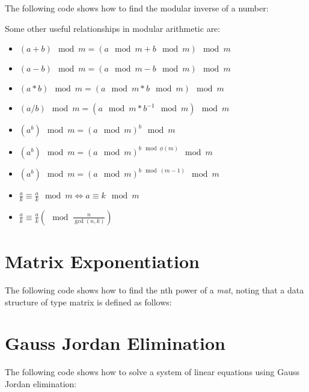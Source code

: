 The following code shows how to find the modular inverse of a number:



Some other useful relationships in modular arithmetic are:

\begin{itemize}
\item $ (a+b) \mod m = (a \mod m + b \mod m) \mod m $
\item $ (a-b) \mod m = (a \mod m - b \mod m) \mod m $
\item $ (a*b) \mod m = (a \mod m * b \mod m) \mod m $
\item $ (a/b) \mod m = (a \mod m * b^{-1} \mod m) \mod m $
\item $ (a^b) \mod m = (a \mod m)^b \mod m $
\item $ (a^b) \mod m = (a \mod m)^{b \mod \phi(m)} \mod m $
\item $ (a^b) \mod m = (a \mod m)^{b \mod (m-1)} \mod m $
\item $ \frac{a}{k} \equiv \frac{a}{k} \mod m \iff a \equiv k \mod m $
\item $ \frac{a}{k} \equiv \frac{a}{k} \left( \mod \frac{n}{\gcd (n,k)}\right)$
\end{itemize}


\section{Matrix Exponentiation}

The following code shows how to find the nth power of a \textit{mat}, noting that a data structure of type matrix is defined as follows:




\section{Gauss Jordan Elimination}

The following code shows how to solve a system of linear equations using Gauss Jordan elimination:



